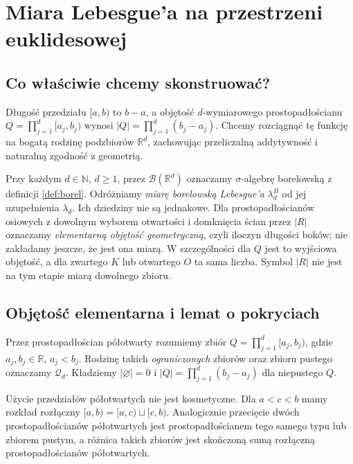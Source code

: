 \chapter{Miara Lebesgue'a na przestrzeni euklidesowej}
\label{ch:lebesgue}

\providecommand{\atlasref}[2]{#2}


\section{Co właściwie chcemy skonstruować?}

Długość przedziału $[a,b)$ to $b-a$, a objętość
$d$-wymiarowego prostopadłościanu
$Q=\prod_{j=1}^d[a_j,b_j)$ wynosi
$|Q|=\prod_{j=1}^d(b_j-a_j)$.
Chcemy rozciągnąć tę funkcję na bogatą rodzinę
podzbiorów $\mathbb R^d$, zachowując przeliczalną
addytywność i naturalną zgodność z geometrią.

Przy każdym $d\in\mathbb N$, $d\ge1$, przez
$\mathcal B(\mathbb R^d)$ oznaczamy $\sigma$-algebrę
borelowską z definicji \ref{def:borel}. Odróżniamy
\emph{miarę borelowską Lebesgue'a} $\lambda_d^B$
od jej uzupełnienia $\lambda_d$. Ich dziedziny nie są
jednakowe. Dla prostopadłościanów osiowych z dowolnym wyborem
otwartości i domknięcia ścian przez $|R|$ oznaczamy
\emph{elementarną objętość geometryczną}, czyli iloczyn
długości boków; nie zakładamy jeszcze, że jest ona miarą.
W szczególności dla $Q$ jest to wyjściowa objętość,
a dla zwartego $K$ lub otwartego $O$ ta sama liczba.
Symbol $|R|$ nie jest na tym etapie miarą dowolnego zbioru.

\section{Objętość elementarna i lemat o pokryciach}

\begin{definicja}
\label{def:halfopen-box}
Przez prostopadłościan półotwarty rozumiemy zbiór
$Q=\prod_{j=1}^d[a_j,b_j)$, gdzie $a_j,b_j\in\mathbb R$,
$a_j<b_j$. Rodzinę takich \emph{ograniczonych} zbiorów
oraz zbioru pustego oznaczamy $\mathcal Q_d$.
Kładziemy $|\varnothing|=0$ i
$|Q|=\prod_{j=1}^d(b_j-a_j)$ dla niepustego $Q$.
\end{definicja}

Użycie przedziałów półotwartych nie jest kosmetyczne.
Dla $a<c<b$ mamy rozkład rozłączny
$[a,b)=[a,c)\sqcup[c,b)$. Analogicznie przecięcie
dwóch prostopadłościanów półotwartych jest
prostopadłościanem tego samego typu lub zbiorem pustym,
a różnica takich zbiorów jest skończoną sumą rozłączną
prostopadłościanów półotwartych.

